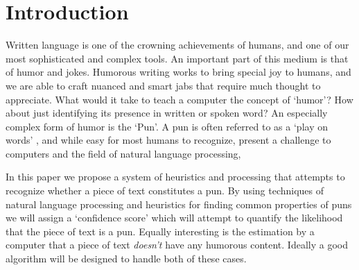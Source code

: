\section{Introduction}

Written language is one of the crowning achievements of humans, and one of our most sophisticated and complex tools. An important part of this medium is that of humor and jokes. Humorous writing works to bring special joy to humans, and we are able to craft nuanced and smart jabs that require much thought to appreciate. What would it take to teach a computer the concept of `humor'? How about just identifying its presence in written or spoken word? An especially complex form of humor is the `Pun'.  A pun  is often referred to as a `play on words' , and while easy for most humans to recognize, present a challenge to computers and the field of natural language processing,

In this paper we propose a system of heuristics and processing that attempts to recognize whether a piece of text constitutes a pun. By using techniques of natural language processing and heuristics for finding common properties of puns we will assign a `confidence score' which will attempt to quantify the likelihood that the piece of text is a pun. Equally interesting is the estimation by a computer that a piece of text \emph{doesn't} have any humorous content. Ideally a good algorithm will be designed to handle both of these cases.
